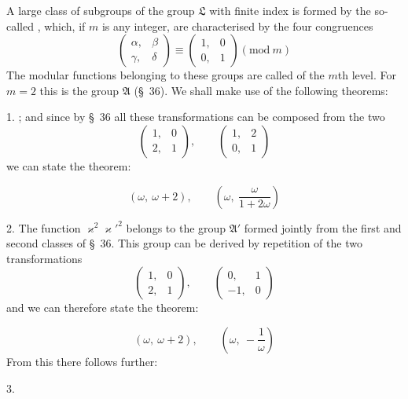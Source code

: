 A large class of subgroups of the group $\mathfrak{L}$ with finite
index is formed by the so-called , which, if
$m$ is any integer, are characterised by the four congruences
\[
\begin{pmatrix} \alpha, & \beta \\ \gamma, & \delta \end{pmatrix} \equiv \begin{pmatrix} 1, & 0 \\ 0, & 1 \end{pmatrix} (\mathrm{mod}\ m)
\]
The modular functions belonging to these groups are
 called  of the $m$th level. For $m = 2$
this is the group $\mathfrak{A}$ (\S\ 36). We shall make use of the
following theorems:

1. ; and since by \S\ 36 all these transformations
can be composed from the two
\[
\begin{pmatrix} 1, & 0 \\ 2, & 1 \end{pmatrix}, \qquad \begin{pmatrix} 1, & 2 \\ 0, & 1 \end{pmatrix}
\]
we can state the theorem:

\[
(\omega,\ \omega+2), \qquad \left(\omega,\ \frac{\omega}{1+2\omega}\right)
\]

2. The function $\varkappa^2\varkappa'^2$ belongs to the group $\mathfrak{A}'$ formed
jointly from the first and second classes of \S\ 36.
This group can be derived by repetition of the two transformations
\[
\begin{pmatrix} 1, & 0 \\ 2, & 1 \end{pmatrix}, \qquad \begin{pmatrix} 0, & 1 \\ -1, & 0 \end{pmatrix}
\]
and we can therefore state the theorem:

\[
(\omega,\ \omega+2), \qquad \left(\omega,\ -\frac{1}{\omega}\right)
\]
From this there follows further:

3. 
